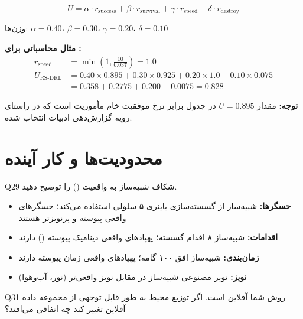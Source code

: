\documentclass[oneside,openany,a4paper,12pt]{article}
\newcommand{\rsdrl}{\lr{RS-DRL}}
\newcommand{\dartsim}{\lr{DARTSim}}
\begin{document}
\begin{hintbox}
\begin{equation}
U = \alpha \cdot r_{\text{success}} + \beta \cdot r_{\text{survival}} + \gamma \cdot r_{\text{speed}} - \delta \cdot r_{\text{destroy}}
\end{equation}

وزن‌ها: $\alpha=0.40$، $\beta=0.30$، $\gamma=0.20$، $\delta=0.10$

\textbf{مثال محاسباتی برای \rsdrl{}:}
\begin{align*}
r_{\text{speed}} &= \min\!\left(1, \frac{10}{0.037}\right) = 1.0 \\
U_{\text{RS-DRL}} &= 0.40 \times 0.895 + 0.30 \times 0.925 + 0.20 \times 1.0 - 0.10 \times 0.075 \\
&= 0.358 + 0.2775 + 0.200 - 0.0075 = 0.828
\end{align*}

\textbf{توجه:} مقدار $U=0.895$ در جدول برابر نرخ موفقیت خام مأموریت است که در راستای رویه گزارش‌دهی ادبیات \dartsim{} انتخاب شده.
\end{hintbox}

\section{محدودیت‌ها و کار آینده}

\begin{questionbox}{Q29}
شکاف شبیه‌ساز به واقعیت () را توضیح دهید.
\end{questionbox}

\begin{hintbox}
\begin{itemize}
  \item \textbf{حسگرها:} شبیه‌ساز از گسسته‌سازی باینری ۵ سلولی استفاده می‌کند؛ حسگرهای واقعی پیوسته و پرنویزتر هستند
  \item \textbf{اقدامات:} شبیه‌ساز ۸ اقدام گسسته؛ پهپادهای واقعی دینامیک پیوسته () دارند
  \item \textbf{زمان‌بندی:} شبیه‌ساز افق ۱۰۰ گامه؛ پهپادهای واقعی زمان پیوسته دارند
  \item \textbf{نویز:} نویز مصنوعی شبیه‌ساز در مقابل نویز واقعی‌تر (نور، آب‌وهوا)
\end{itemize}
\end{hintbox}

\begin{questionbox}{Q31}
روش شما  آفلاین است. اگر توزیع محیط به طور قابل توجهی از مجموعه داده آفلاین تغییر کند چه اتفاقی می‌افتد؟
\end{questionbox}
\end{document}
